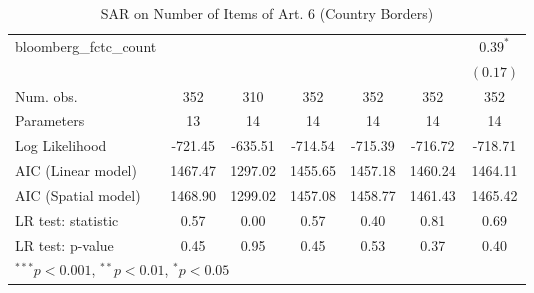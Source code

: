 \begin{table}[!h]
\begin{center}
\begin{tabular}{l c c c c c c }
bloomberg\_fctc\_count  &               &              &              &              &              & $0.39^{*}$   \\
                        &               &              &              &              &              & $(0.17)$     \\
\midrule
Num. obs.               & 352           & 310          & 352          & 352          & 352          & 352          \\
Parameters              & 13            & 14           & 14           & 14           & 14           & 14           \\
Log Likelihood          & -721.45       & -635.51      & -714.54      & -715.39      & -716.72      & -718.71      \\
AIC (Linear model)      & 1467.47       & 1297.02      & 1455.65      & 1457.18      & 1460.24      & 1464.11      \\
AIC (Spatial model)     & 1468.90       & 1299.02      & 1457.08      & 1458.77      & 1461.43      & 1465.42      \\
LR test: statistic      & 0.57          & 0.00         & 0.57         & 0.40         & 0.81         & 0.69         \\
LR test: p-value        & 0.45          & 0.95         & 0.45         & 0.53         & 0.37         & 0.40         \\
\bottomrule
\multicolumn{7}{l}{\scriptsize{$^{***}p<0.001$, $^{**}p<0.01$, $^*p<0.05$}}
\end{tabular}
\caption{SAR on Number of Items of Art. 6 (Country Borders)}
\label{table:coefficients}
\end{center}
\end{table}
